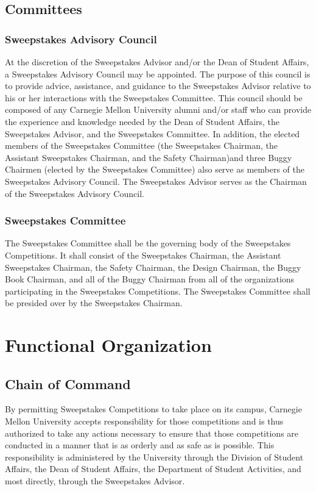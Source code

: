 \subsection{Committees}

\subsubsection{Sweepstakes Advisory Council}

	At the discretion of the Sweepstakes Advisor and/or the Dean of Student Affairs, a Sweepstakes Advisory Council may be appointed. The purpose of this council is to provide advice, assistance, and guidance to the Sweepstakes Advisor relative to his or her interactions with the Sweepstakes Committee. This council should be composed of any Carnegie Mellon University alumni and/or staff who can provide the experience and knowledge needed by the Dean of Student Affairs, the Sweepstakes Advisor, and the Sweepstakes Committee. In addition, the elected members of the Sweepstakes Committee (the Sweepstakes Chairman, the Assistant Sweepstakes Chairman, and the Safety Chairman)and three Buggy Chairmen (elected by the Sweepstakes Committee) also serve as members of the Sweepstakes Advisory Council. The Sweepstakes Advisor serves as the Chairman of the Sweepstakes Advisory Council.

\subsubsection{Sweepstakes Committee}

	The Sweepstakes Committee shall be the governing body of the Sweepstakes Competitions. It shall consist of the Sweepstakes Chairman, the Assistant Sweepstakes Chairman, the Safety Chairman, the Design Chairman, the Buggy Book Chairman, and all of the Buggy Chairman from all of the organizations participating in the Sweepstakes Competitions. The Sweepstakes Committee shall be presided over by the Sweepstakes Chairman.

\section{Functional Organization}

\subsection{Chain of Command}

	By permitting Sweepstakes Competitions to take place on its campus, Carnegie Mellon University accepts responsibility for those competitions and is thus authorized to take any actions necessary to ensure that those competitions are conducted in a manner that is as orderly and as safe as is possible. This responsibility is administered by the University through the Division of Student Affairs, the Dean of Student Affairs, the Department of Student Activities, and most directly, through the Sweepstakes Advisor.


